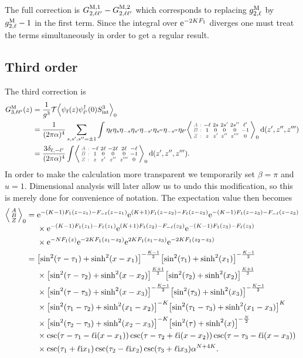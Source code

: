 \documentclass[english, parskip=full]{scrartcl}
\begin{document}
The full correction is $G_{2,\ell\ell'}^{\text{M},1} - G_{2,\ell\ell'}^{\text{M},2}$ which corresponds to replacing $g_{2,\ell}^{\text{M}}$ by $g_{2,\ell}^{\text{M}} - 1$ in the first term.
Since the integral over $\text{e}^{-2KF_1}$ diverges one must treat the terms simultaneously in order to get a regular result.
\subsection{Third order}
The third correction is
\begin{align}
G_{3,\ell\ell'}^{\M}(z) &= \frac{1}{g^3}\mathcal{T}\bra*{\psi_\ell(z)\psi_{\ell'}^\dagger(0) S_\Text{int}^3}_0\\
&= \frac{1}{(2\pi\alpha)^4} \sum_{s,s',s''=\pm 1} \int \eta_{\ell}\eta_{s} \eta_{-s}\eta_{s'} \eta_{-s'}\eta_{s''} \eta_{-s''} \eta_{\ell'} \bra*{\zabx{-\ell & 2s & 2s' & 2s'' & \ell'}{1 & 0 & 0 & 0 & -1}{z& z' & z'' & z''' & 0}}_0\,\d (z',z'',z''')\\
&= \frac{3\delta_{\ell,-\ell'}}{(2\pi\alpha)^4} \int \bra*{\zabx{-\ell & 2\ell & -2\ell & 2\ell & -\ell}{1 & 0 & 0 & 0 & -1}{z& z' & z'' & z''' & 0}}_0\,\d (z',z'',z''').
\end{align}
In order to make the calculation more transparent we temporarily set $\beta=\pi$ and $u=1$.
Dimensional analysis will later allow us to undo this modification, so this is merely done for convenience of notation.
The expectation value then becomes
\begin{align}
\bra*{\abx{A}{B}{Z}}_0 &= \bsplit{ &\powe{-(K-1)F_1(z-z_1) - F_{-\ell}(z-z_1)} \powe{(K+1)F_1(z-z_2) - F_{\ell}(z-z_2)} \powe{-(K-1)F_1(z-z_3) - F_{-\ell}(z-z_3)}\\
&\times \powe{-(K-1)F_1(z_1) - F_\ell(z_1)} \powe{(K+1)F_1(z_2) - F_{-\ell}(z_2)} \powe{-(K-1)F_1(z_3) - F_\ell(z_3)} \\
&\times \powe{-NF_1(z)} \powe{-2KF_1(z_1-z_2)} \powe{2KF_1(z_1-z_3)} \powe{-2KF_1(z_2-z_3)} }\\
&= \bsplit{&\klb*{\sin^2(\tau-\tau_1) + \sinh^2(x-x_1)}^{-\frac{K-1}{2}} \klb*{\sin^2(\tau_1) + \sinh^2(x_1)}^{-\frac{K-1}{2}} \\
&\times \klb*{\sin^2(\tau-\tau_2) + \sinh^2(x-x_2)}^{\frac{K+1}{2}} \klb*{\sin^2(\tau_2) + \sinh^2(x_2)}^{\frac{K+1}{2}} \\
&\times \klb*{\sin^2(\tau-\tau_3) + \sinh^2(x-x_3)}^{-\frac{K-1}{2}} \klb*{\sin^2(\tau_3) + \sinh^2(x_3)}^{-\frac{K-1}{2}} \\
&\times \klb*{\sin^2(\tau_1-\tau_2) + \sinh^2(x_1-x_2)}^{-K}  \klb*{\sin^2(\tau_1-\tau_3) + \sinh^2(x_1-x_3)}^{K} \\
&\times \klb*{\sin^2(\tau_2-\tau_3) + \sinh^2(x_2-x_3)}^{-K}  \klb*{\sin^2(\tau) + \sinh^2(x)}^{-\frac{N}{2}} \\
&\times \csc\kla*{\tau-\tau_1 - \ell\i (x-x_1)} \csc\kla*{\tau-\tau_2 + \ell\i (x-x_2)} \csc\kla*{\tau-\tau_3 - \ell\i (x-x_3)} \\
&\times \csc\kla*{\tau_1 + \ell\i x_1} \csc\kla*{\tau_2 - \ell\i x_2} \csc\kla*{\tau_3 + \ell\i x_3} \alpha^{N+4K}. }
\end{align}
\end{document}

